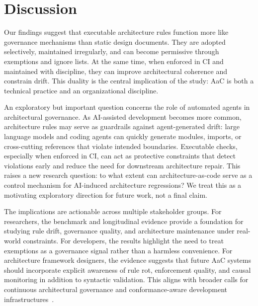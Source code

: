 \section{Discussion}\label{sec:discussion}

Our findings suggest that executable architecture rules function more like governance mechanisms than static design documents. They are adopted selectively, maintained irregularly, and can become permissive through exemptions and ignore lists. At the same time, when enforced in CI and maintained with discipline, they can improve architectural coherence and constrain drift. This duality is the central implication of the study: AaC is both a technical practice and an organizational discipline.

An exploratory but important question concerns the role of automated agents in architectural governance. As AI-assisted development becomes more common, architecture rules may serve as guardrails against agent-generated drift: large language models and coding agents can quickly generate modules, imports, or cross-cutting references that violate intended boundaries. Executable checks, especially when enforced in CI, can act as protective constraints that detect violations early and reduce the need for downstream architecture repair. This raises a new research question: to what extent can architecture-as-code serve as a control mechanism for AI-induced architecture regressions? We treat this as a motivating exploratory direction for future work, not a final claim.

The implications are actionable across multiple stakeholder groups. For researchers, the benchmark and longitudinal evidence provide a foundation for studying rule drift, governance quality, and architecture maintenance under real-world constraints. For developers, the results highlight the need to treat exemptions as a governance signal rather than a harmless convenience. For architecture framework designers, the evidence suggests that future AaC systems should incorporate explicit awareness of rule rot, enforcement quality, and causal monitoring in addition to syntactic validation. This aligns with broader calls for continuous architectural governance and conformance-aware development infrastructures~\cite{contaac,archguard}.

